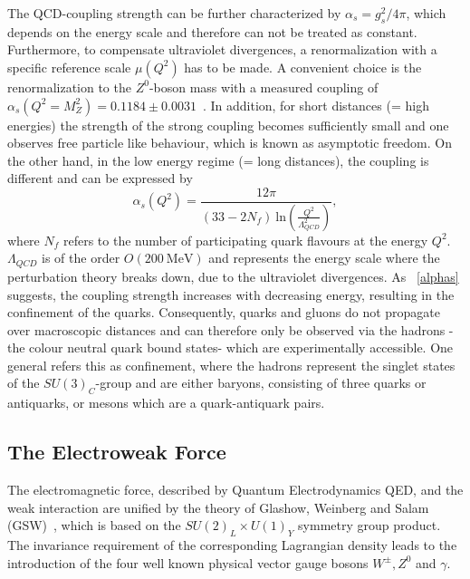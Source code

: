 \noindent The QCD-coupling strength can be further characterized by  $\alpha_s = g_s^2/4\pi$, which depends  on the energy scale and therefore can not be treated as constant. Furthermore, to compensate ultraviolet divergences, a renormalization with a specific reference scale $\mu(Q^2)$ has to be made. A convenient choice is the renormalization to the $Z^0$-boson mass with a measured coupling of $\alpha_s(Q^2=M_Z^2) = 0.1184 \pm 0.0031$~\cite{Bethke:2000ai}. In addition, for short distances (= high energies) the strength of the strong coupling becomes sufficiently small and one observes free particle like behaviour, which is known as asymptotic freedom. On the other hand, in the low energy regime (= long distances), the coupling is different and can be expressed by 
\begin{equation}\label{alphas}
\alpha_s(Q^2)=\frac{12\pi}{(33-2N_f)~\text{ln}(\frac{Q^2}{\Lambda_{QCD}^2})},
\end{equation}
where $N_f$ refers to the number of participating quark flavours at the energy $Q^2$. $\Lambda_{QCD}$ is of the order $O(200~\text{MeV})$ and represents the energy scale where the perturbation theory  breaks down, due to the ultraviolet divergences. As ~\cref{alphas} suggests, the coupling strength increases with decreasing energy, resulting in the confinement of the quarks. Consequently, quarks and gluons do not propagate over macroscopic distances and can therefore only be observed via the hadrons -the colour neutral quark bound states- which are experimentally accessible. One general refers this as confinement, where the hadrons represent the singlet states of  the $SU(3)_C$-group and are either baryons, consisting of three quarks or antiquarks,  or mesons which are a quark-antiquark pairs. 
























\subsection{The Electroweak Force}\label{EW}
The electromagnetic force, described by Quantum Electrodynamics QED, and the weak interaction are unified by the theory of Glashow, Weinberg and Salam (GSW)~\cite{Glashow:1961tr,Weinberg:1967tq,Salam:1964ry}, which is based on the $SU(2)_L\times U(1)_Y$ symmetry group product. The invariance requirement of the corresponding Lagrangian density leads to the introduction of the four well known physical vector gauge bosons $W^{\pm}, Z^0$ and $\gamma$.

